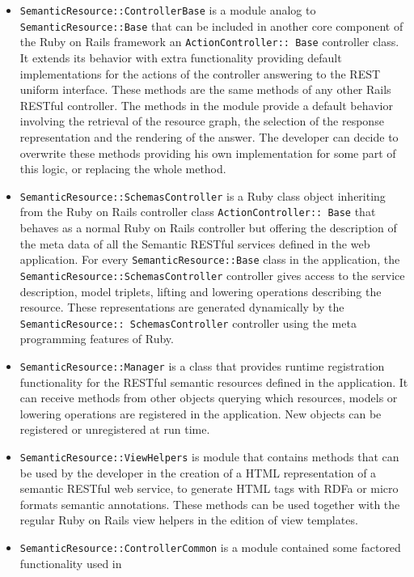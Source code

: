 \begin{itemize}
\item \texttt{SemanticResource::ControllerBase} is a module analog to\\  \texttt{SemanticResource::Base} that can be included
  in another core component of the Ruby on Rails framework an \texttt{ActionController:: Base} controller class. It extends its
  behavior with extra functionality providing default implementations for the actions of the controller answering to the REST uniform interface. These methods are the same methods of any other
  Rails RESTful controller. The methods in the module provide a default behavior involving the retrieval of the resource
  graph, the selection of the response representation and the rendering of the answer. The developer can decide to
  overwrite these methods providing his own implementation for some part of this logic, or replacing the whole method.
\item \texttt{SemanticResource::SchemasController} is a Ruby class object inheriting from the Ruby on Rails controller
  class \texttt{ActionController:: Base} that behaves as a normal Ruby on Rails controller but offering the description
  of the meta data of all the Semantic RESTful services defined in the web application. For every
  \texttt{SemanticResource::Base} class in the application, the \texttt{SemanticResource::SchemasController} controller
  gives access to the service description, model triplets, lifting and lowering operations describing the
  resource. These representations are generated dynamically by the \texttt{SemanticResource:: SchemasController}
  controller using the meta programming features of Ruby.
\item \texttt{SemanticResource::Manager} is a class that provides runtime registration functionality for the RESTful semantic
  resources defined in the application. It can receive methods from other objects querying which resources, models or
  lowering operations are registered in the application. New objects can be registered or unregistered at run time.
\item \texttt{SemanticResource::ViewHelpers} is module that contains methods that can be used by the developer in the
  creation of a HTML representation of a semantic RESTful web service, to generate HTML tags with RDFa or micro formats
  semantic annotations. These methods can be used together with the regular Ruby on Rails view helpers in the edition of
  view templates.
\item \texttt{SemanticResource::ControllerCommon} is a module contained some factored functionality used in

\end{itemize}
